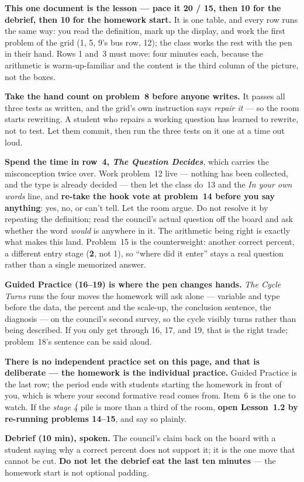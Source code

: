 \documentclass[10pt]{article}
\begin{document}
\begin{teachernote}
\textbf{This one document is the lesson --- pace it 20 / 15, then 10 for the debrief, then 10
for the homework start.} It is one table, and every row runs the same way: you read the
definition, mark up the display, and work the first problem of the grid (1, 5, 9's bus row,
12); the class works the rest with the pen in their hand. Rows 1 and~3 must move: four minutes
each, because the arithmetic is warm-up-familiar and the content is the third column of the
picture, not the boxes.

\textbf{Take the hand count on problem~8 before anyone writes.} It passes all three tests as
written, and the grid's own instruction says \emph{repair it} --- so the room starts
rewriting. A student who repairs a working question has learned to rewrite, not to test. Let
them commit, then run the three tests on it one at a time out loud.

\textbf{Spend the time in row~4, \emph{The Question Decides}}, which carries the
misconception twice over. Work problem~12 live --- nothing has been collected, and the type is
already decided --- then let the class do~13 and the \emph{In your own words} line, and
\textbf{re-take the hook vote at problem~14 before you say anything}: yes, no, or can't tell.
Let the room argue. Do not resolve it by repeating the definition; read the council's actual
question off the board and ask whether the word \emph{would} is anywhere in it. The arithmetic
being right is exactly what makes this land. Problem~15 is the counterweight: another correct
percent, a different entry stage (\textbf{2}, not 1), so ``where did it enter'' stays a real
question rather than a single memorized answer.

\textbf{Guided Practice (16--19) is where the pen changes hands.} \emph{The Cycle Turns} runs
the four moves the homework will ask alone --- variable and type before the data, the percent
and the scale-up, the conclusion sentence, the diagnosis --- on the council's second survey,
so the cycle visibly turns rather than being described. If you only get through 16, 17, and
19, that is the right trade; problem~18's sentence can be said aloud.

\textbf{There is no independent practice set on this page, and that is deliberate --- the
homework is the individual practice.} Guided Practice is the last row; the period ends with
students starting the homework in front of you, which is where your second formative read
comes from. Item~6 is the one to watch. If the \emph{stage 4} pile is more than a third of the
room, \textbf{open Lesson~1.2 by re-running problems 14--15}, and say so plainly.

\textbf{Debrief (10 min), spoken.} The council's claim back on the board with a student saying
why a correct percent does not support it; it is the one move that cannot be cut. \textbf{Do
not let the debrief eat the last ten minutes} --- the homework start is not optional padding.
\end{teachernote}
\end{document}
